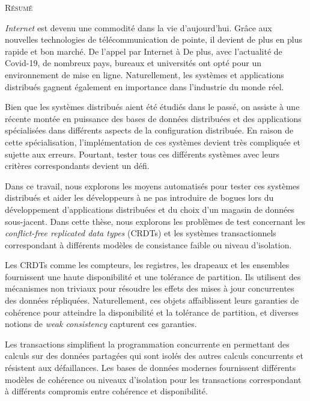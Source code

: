 
\begin{center}
  \textsc{Résumé}
\end{center}
%
\noindent
%


\emph{Internet} est devenu une commodité dans la vie d'aujourd'hui. Grâce aux nouvelles technologies de télécommunication de pointe, il devient de plus en plus rapide et bon marché. De l'appel par Internet à De plus, avec l'actualité de Covid-19, de nombreux pays, bureaux et universités ont opté pour un environnement de mise en ligne. Naturellement, les systèmes et applications distribués gagnent également en importance dans l'industrie du monde réel.

Bien que les systèmes distribués aient été étudiés dans le passé, on assiste à une récente montée en puissance des bases de données distribuées et des applications spécialisées dans différents aspects de la configuration distribuée. En raison de cette spécialisation, l'implémentation de ces systèmes devient très compliquée et sujette aux erreurs. Pourtant, tester tous ces différents systèmes avec leurs critères correspondants devient un défi.

Dans ce travail, nous explorons les moyens automatisés pour tester ces systèmes distribués et aider les développeurs à ne pas introduire de bogues lors du développement d'applications distribuées et du choix d'un magasin de données sous-jacent. Dans cette thèse, nous explorons les problèmes de test concernant les \emph{conflict-free replicated data types} (CRDTs) et les systèmes transactionnels correspondant à différents modèles de consistance faible ou niveau d'isolation.

Les CRDTs comme les compteurs, les registres, les drapeaux et les ensembles fournissent une haute disponibilité et une tolérance de partition. Ils utilisent des mécanismes non triviaux pour résoudre les effets des mises à jour concurrentes des données répliquées. Naturellement, ces objets affaiblissent leurs garanties de cohérence pour atteindre la disponibilité et la tolérance de partition, et diverses notions de \emph{weak consistency} capturent ces garanties.

Les transactions simplifient la programmation concurrente en permettant des calculs sur des données partagées qui sont isolés des autres calculs concurrents et résistent aux défaillances. Les bases de données modernes fournissent différents modèles de cohérence ou niveaux d'isolation pour les transactions correspondant à différents compromis entre cohérence et disponibilité.

